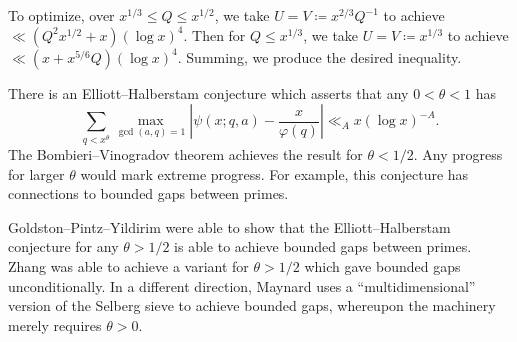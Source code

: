 \documentclass[../notes.tex]{subfiles}
\begin{document}
To optimize, over $x^{1/3}\le Q\le x^{1/2}$, we take $U=V\coloneqq x^{2/3}Q^{-1}$ to achieve $\ll\left(Q^2x^{1/2}+x\right)(\log x)^4$. Then for $Q\le x^{1/3}$, we take $U=V\coloneqq x^{1/3}$ to achieve $\ll\left(x+x^{5/6}Q\right)(\log x)^4$. Summing, we produce the desired inequality.
\begin{remark}
	There is an Elliott--Halberstam conjecture which asserts that any $0<\theta<1$ has
	\[\sum_{q<x^\theta}\max_{\gcd(a,q)=1}\left|\psi(x;q,a)-\frac x{\varphi(q)}\right|\ll_A x(\log x)^{-A}.\]
	The Bombieri--Vinogradov theorem achieves the result for $\theta<1/2$. Any progress for larger $\theta$ would mark extreme progress. For example, this conjecture has connections to bounded gaps between primes.
\end{remark}
\begin{remark}
	Goldston--Pintz--Yildirim were able to show that the Elliott--Halberstam conjecture for any $\theta>1/2$ is able to achieve bounded gaps between primes. Zhang was able to achieve a variant for $\theta>1/2$ which gave bounded gaps unconditionally. In a different direction, Maynard uses a ``multidimensional'' version of the Selberg sieve to achieve bounded gaps, whereupon the machinery merely requires $\theta>0$.
\end{remark}
\end{document}
